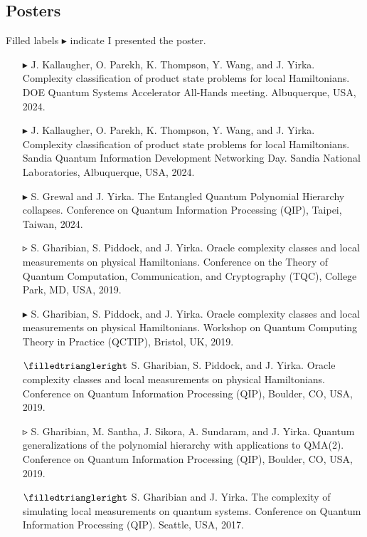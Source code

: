 \documentclass[11pt,letterpaper,serif]{moderncv}
\begin{document}
\smallskip
\subsection{Posters}
{\footnotesize
	Filled labels $\blacktriangleright$ indicate I presented the poster.
}
\begin{itemize}
	\item[$\blacktriangleright$]
	J. Kallaugher, O. Parekh, K. Thompson, Y. Wang, and J. Yirka.\quad
	Complexity classification of product state problems for local Hamiltonians.\quad
	DOE Quantum Systems Accelerator All-Hands meeting. Albuquerque, USA, 2024.

	\item[$\blacktriangleright$]
	J. Kallaugher, O. Parekh, K. Thompson, Y. Wang, and J. Yirka.\quad
	Complexity classification of product state problems for local Hamiltonians.\quad
	Sandia Quantum Information Development Networking Day. Sandia National Laboratories, Albuquerque, USA, 2024.

	\item[$\blacktriangleright$]
	S. Grewal and J. Yirka.\quad
	The Entangled Quantum Polynomial Hierarchy collapses.\quad
	Conference on Quantum Information Processing (QIP), Taipei, Taiwan, 2024.

	\item[$\smalltriangleright$]
	S. Gharibian, S. Piddock, and J. Yirka.\quad
	Oracle complexity classes and local measurements on physical Hamiltonians.\quad
	Conference on the Theory of Quantum Computation, Communication, and Cryptography (TQC), College Park, MD, USA, 2019.

	\item[$\blacktriangleright$]
	S. Gharibian, S. Piddock, and J. Yirka.\quad
	Oracle complexity classes and local measurements on physical Hamiltonians.\quad
	Workshop on Quantum Computing Theory in Practice (QCTIP), Bristol, UK, 2019.

	\item[$\filledtriangleright$]
	S. Gharibian, S. Piddock, and J. Yirka.\quad
	Oracle complexity classes and local measurements on physical Hamiltonians.\quad
	Conference on Quantum Information Processing (QIP), Boulder, CO, USA, 2019.

	\item[$\smalltriangleright$]
	S. Gharibian, M. Santha, J. Sikora, A. Sundaram, and J. Yirka.\quad
	Quantum generalizations of the polynomial hierarchy with applications to QMA(2).\quad
	Conference on Quantum Information Processing (QIP), Boulder, CO, USA, 2019.

	\item[$\filledtriangleright$]
	S. Gharibian and J. Yirka.\quad
	The complexity of simulating local measurements on quantum systems.\quad
	Conference on Quantum Information Processing (QIP). Seattle, USA, 2017.
\end{itemize}
\end{document}

